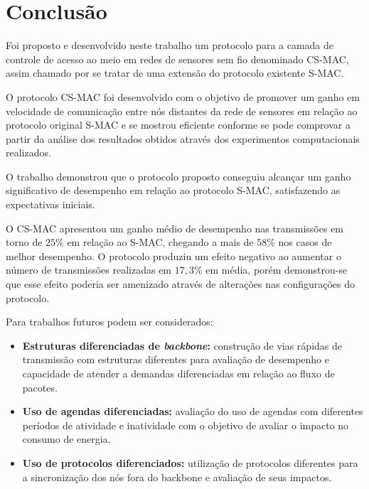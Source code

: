 \section{Conclusão}

Foi proposto e desenvolvido neste trabalho um protocolo para a camada de controle de acesso ao meio em redes de sensores sem fio denominado CS-MAC, assim chamado por se tratar de uma extensão do protocolo existente S-MAC. 

O protocolo CS-MAC foi desenvolvido com o objetivo de promover um ganho em velocidade de comunicação entre nós distantes da rede de sensores em relação ao protocolo original S-MAC e se mostrou eficiente conforme se pode comprovar a partir da análise dos resultados obtidos através dos experimentos computacionais realizados.

O trabalho demonstrou que o protocolo proposto conseguiu alcançar um ganho significativo de desempenho em relação ao protocolo S-MAC, satisfazendo as expectativas iniciais.

O CS-MAC apresentou um ganho médio de desempenho nas transmissões em torno de  $25\%$ em relação ao S-MAC, chegando a mais de $58\%$ nos casos de melhor desempenho. O protocolo produziu um efeito negativo ao aumentar o número de transmissões realizadas em $17,3\%$ em média, porém demonstrou-se que esse efeito poderia ser amenizado através de alterações nas configurações do protocolo.

Para trabalhos futuros podem ser considerados:

\begin{itemize}

\item \textbf{Estruturas diferenciadas de \emph{backbone}:} construção de vias rápidas de transmissão com estruturas diferentes para avaliação de desempenho e capacidade de atender a demandas diferenciadas em relação ao fluxo de pacotes.

\item \textbf{Uso de agendas diferenciadas:} avaliação do uso de agendas com diferentes períodos de atividade e inatividade com o objetivo de avaliar o impacto no consumo de energia.

\item \textbf{Uso de protocolos diferenciados:} utilização de protocolos diferentes para a sincronização dos nós fora do backbone e avaliação de seus impactos.

\end{itemize}